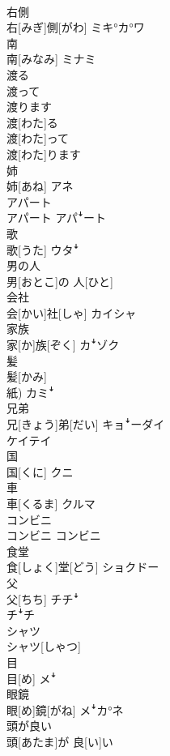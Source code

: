\documentclass[8pt]{extreport}
\begin{document}
\begin{CJK}{UTF8}{min}
\\	右側	
\\	右[みぎ]側[がわ]	ミキ°カ°ワ
\\	南	
\\	南[みなみ]	ミナミ
\\	渡る 
\\	渡って 
\\	渡ります	
\\	渡[わた]る 
\\	渡[わた]って 
\\	渡[わた]ります	
\\	姉	
\\	姉[あね]	アネ
\\	アパート	
\\	アパート	アパꜜート
\\	歌	
\\	歌[うた]	ウタꜜ
\\	男の人	
\\	男[おとこ]の 人[ひと]	
\\	会社	
\\	会[かい]社[しゃ]	カイシャ
\\	家族	
\\	家[か]族[ぞく]	カꜜゾク
\\	髪	
\\	髪[かみ] 
\\	紙)	カミꜜ
\\	兄弟	
\\	兄[きょう]弟[だい]	キョꜜーダイ 
\\	ケイテイ
\\	国	
\\	国[くに]	クニ
\\	車	
\\	車[くるま]	クルマ
\\	コンビニ	
\\	コンビニ	コンビニ
\\	食堂	
\\	食[しょく]堂[どう]	ショクドー
\\	父	
\\	父[ちち]	チチꜜ 
\\	チꜜチ
\\	シャツ	
\\	[てぃー]シャツ[しゃつ]	
\\	目	
\\	目[め]	メꜜ
\\	眼鏡	
\\	眼[め]鏡[がね]	メꜜカ°ネ
\\	頭が良い	
\\	頭[あたま]が 良[い]い	

\end{CJK}
\end{document}
